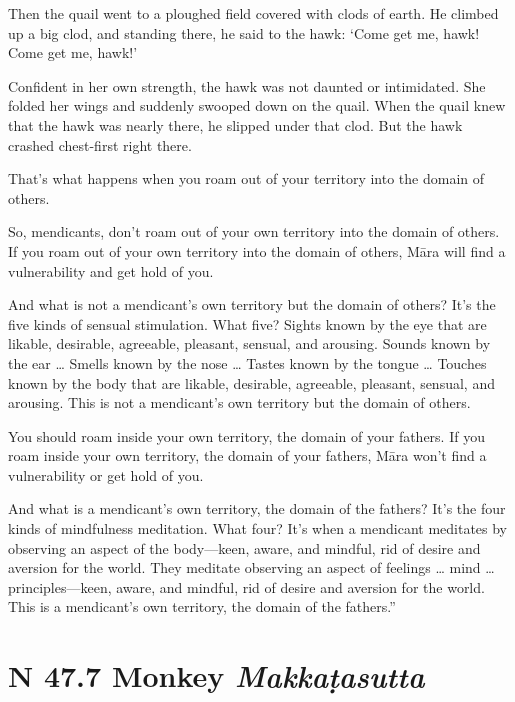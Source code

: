 \documentclass[12pt,openany]{book}%
\newcommand*{\suttatitleacronym}[1]{\smaller[2]{#1}\vspace*{.3em}}
\newcommand*{\suttatitletranslation}[1]{\linebreak{#1}}
\newcommand*{\suttatitleroot}[1]{\linebreak\smaller[2]\itshape{#1}}
\newcommand*{\tocacronym}[1]{\hspace*{-3.3em}{#1}\quad}
\newcommand*{\toctranslation}[1]{#1}
\newcommand*{\tocroot}[1]{(\textit{#1})}
\begin{document}
Then the quail went to a ploughed field covered with clods of earth. He climbed up a big clod, and standing there, he said to the hawk: ‘Come get me, hawk! Come get me, hawk!’ 

Confident in her own strength, the hawk was not daunted or intimidated. She folded her wings and suddenly swooped down on the quail. When the quail knew that the hawk was nearly there, he slipped under that clod. But the hawk crashed chest-first right there. 

That’s what happens when you roam out of your territory into the domain of others. 

So, mendicants, don’t roam out of your own territory into the domain of others. If you roam out of your own territory into the domain of others, \textsanskrit{Māra} will find a vulnerability and get hold of you. 

And what is not a mendicant’s own territory but the domain of others? It’s the five kinds of sensual stimulation. What five? Sights known by the eye that are likable, desirable, agreeable, pleasant, sensual, and arousing. Sounds known by the ear … Smells known by the nose … Tastes known by the tongue … Touches known by the body that are likable, desirable, agreeable, pleasant, sensual, and arousing. This is not a mendicant’s own territory but the domain of others. 

You should roam inside your own territory, the domain of your fathers. If you roam inside your own territory, the domain of your fathers, \textsanskrit{Māra} won’t find a vulnerability or get hold of you. 

And what is a mendicant’s own territory, the domain of the fathers? It’s the four kinds of mindfulness meditation. What four? It’s when a mendicant meditates by observing an aspect of the body—keen, aware, and mindful, rid of desire and aversion for the world. They meditate observing an aspect of feelings … mind … principles—keen, aware, and mindful, rid of desire and aversion for the world. This is a mendicant’s own territory, the domain of the fathers.” 

%
\section*{{\suttatitleacronym SN 47.7}{\suttatitletranslation A Monkey }{\suttatitleroot Makkaṭasutta}}
\addcontentsline{toc}{section}{\tocacronym{SN 47.7} \toctranslation{A Monkey } \tocroot{Makkaṭasutta}}
\end{document}
